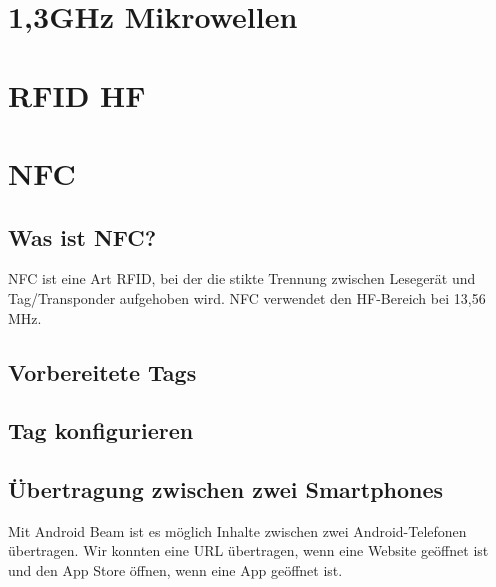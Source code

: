 \documentclass[a4paper,12pt,headsepline,footsepline]{scrartcl}
\begin{document}
\section{1,3GHz Mikrowellen}

\section{RFID HF}

\section{NFC}

\subsection{Was ist NFC?}

NFC ist eine Art RFID, bei der die stikte Trennung zwischen Lesegerät und Tag/Transponder aufgehoben wird.
NFC verwendet den HF-Bereich bei 13,56 MHz.

\subsection{Vorbereitete Tags}

\subsection{Tag konfigurieren}

\subsection{Übertragung zwischen zwei Smartphones}

Mit Android Beam ist es möglich Inhalte zwischen zwei Android-Telefonen übertragen.
Wir konnten eine URL übertragen, wenn eine Website geöffnet ist und den App Store
öffnen, wenn eine App geöffnet ist.
\end{document}

